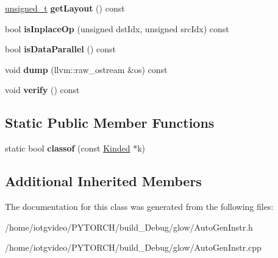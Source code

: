 \begin{DoxyCompactItemize}
\mbox{\label{classglow_1_1_avg_pool_inst_adc69b83d5a491ff561eb6749e0d4ec2c}} 
\hyperlink{namespaceglow_a0ca574644e1e42ef193a9947fb4d8911}{unsigned\+\_\+t} {\bfseries get\+Layout} () const
\item 
\mbox{\label{classglow_1_1_avg_pool_inst_a5eb0a19b323e4c190484bb0bc876cb27}} 
bool {\bfseries is\+Inplace\+Op} (unsigned dst\+Idx, unsigned src\+Idx) const
\item 
\mbox{\label{classglow_1_1_avg_pool_inst_a29d2d96fdecc4158a9301732f545934e}} 
bool {\bfseries is\+Data\+Parallel} () const
\item 
\mbox{\label{classglow_1_1_avg_pool_inst_a2a3851e62d37af2627571bb1026ef86e}} 
void {\bfseries dump} (llvm\+::raw\+\_\+ostream \&os) const
\item 
\mbox{\label{classglow_1_1_avg_pool_inst_a858fcccb498e26f89e88cde09e8d506a}} 
void {\bfseries verify} () const
\end{DoxyCompactItemize}
\subsection*{Static Public Member Functions}
\begin{DoxyCompactItemize}
\item 
\mbox{\label{classglow_1_1_avg_pool_inst_af0c609f835573a62c673b4de6f0fd5db}} 
static bool {\bfseries classof} (const \hyperlink{classglow_1_1_kinded}{Kinded} $\ast$k)
\end{DoxyCompactItemize}
\subsection*{Additional Inherited Members}


The documentation for this class was generated from the following files\+:\begin{DoxyCompactItemize}
\item 
/home/iotgvideo/\+P\+Y\+T\+O\+R\+C\+H/build\+\_\+\+Debug/glow/Auto\+Gen\+Instr.\+h\item 
/home/iotgvideo/\+P\+Y\+T\+O\+R\+C\+H/build\+\_\+\+Debug/glow/Auto\+Gen\+Instr.\+cpp\end{DoxyCompactItemize}
